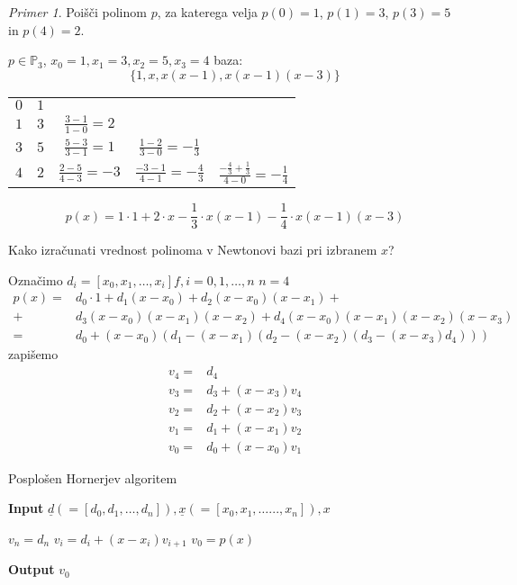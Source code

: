 \documentclass[a4paper,12pt]{article}
\theoremstyle{definition}
\theoremstyle{remark}
\newtheorem*{ex}{Primer}
\newcommand{\Pp}{\mathbb{P}}
\begin{document}
\begin{ex}
    Poišči polinom $p$, za katerega velja $p(0) = 1$, $p(1) = 3$, $p(3) = 5$ in $p(4) = 2$.

    $p \in \Pp_3$, $x_0 = 1, x_1 =3,  x_2 = 5, x_3 = 4$
    baza:
    \begin{equation*}
        \{1, x, x(x-1), x(x-1)(x-3)\}
    \end{equation*}
    \begin{center}
        \begin{tabular}{c|c c c c}
            $0$ & $1$ \\
            $1$ & $3$ & $\frac{3-1}{1-0} = 2$ \\
            $3$ & $5$ & $\frac{5-3}{3-1} = 1$ & $\frac{1-2}{3-0} = -\frac{1}{3}$ \\
            $4$ & $2$ & $\frac{2-5}{4-3} = -3$ & $\frac{-3-1}{4-1} = -\frac{4}{3}$ & $\frac{-\frac{4}{3}+\frac{1}{3}}{4-0} = -\frac{1}{4}$
        \end{tabular}
    \end{center}
    \begin{equation*}
        p(x) = 1 \cdot 1 + 2 \cdot x - \frac{1}{3} \cdot x(x-1) - \frac{1}{4} \cdot x(x-1)(x-3)
    \end{equation*}
\end{ex}

Kako izračunati vrednost polinoma v Newtonovi bazi pri izbranem $x$?

Označimo $d_i = [x_0, x_1, \dots, x_i] f, i = 0, 1, \dots, n$
$n = 4$
\begin{align*}
    p(x) =& d_0 \cdot 1 + d_1 (x-x_0) + d_2 (x-x_0)(x-x_1) + \\
         +& d_3 (x-x_0)(x-x_1)(x-x_2) + d_4 (x-x_0)(x-x_1)(x-x_2)(x-x_3) \\
         =& d_0 + (x-x_0)(d_1 - (x-x_1)(d_2 - (x-x_2)(d_3 - (x-x_3)d_4)))
\end{align*}
zapišemo
\begin{align*}
    v_4 =& d_4 \\
    v_3 =& d_3 + (x-x_3)v_4 \\
    v_2 =& d_2 + (x-x_2)v_3 \\
    v_1 =& d_1 + (x-x_1)v_2 \\
    v_0 =& d_0 + (x-x_0)v_1
\end{align*}



\begin{algorithm}
    \caption{Posplošen Hornerjev algoritem}\label{alg:horner}
    \hspace*{\algorithmicindent} \textbf{Input} $\underline{d} (= [d_0, d_1, \dots, d_n]), \underline{x}(= [x_0, x_1, \dots..., x_n]), x$
    \begin{algorithmic}
        \State $v_n = d_n$
            \State $v_i = d_i + (x-x_i) v_{i+1}$
        \EndFor
        \State $v_0 = p(x)$
    \end{algorithmic}
    \hspace*{\algorithmicindent} \textbf{Output} $v_0$
\end{algorithm}
\end{document}
